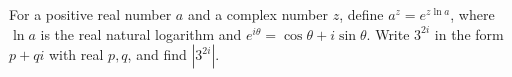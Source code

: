 For a positive real number $a$ and a complex number $z$, define $a^z=e^{z\ln a}$, where $\ln a$ is the real natural logarithm and $e^{i\theta}=\cos\theta+i\sin\theta$. Write $3^{2i}$ in the form $p+qi$ with real $p,q$, and find $\left|3^{2i}\right|$.
